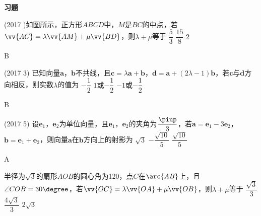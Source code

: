 \begin{exercise}{\textbf{习题}}
  \item%
    (2017 )如图所示，正方形$ABCD$中，$M$是$BC$的中点，若$\vv{AC}=\lambda\vv{AM}+\mu\vv{BD}$，则$\lambda+\mu$等于\xz
     {$\dfrac{5}3$}
     {$\dfrac{15}8$}
     {$2$}
    \begin{center}
    \end{center}
    \begin{answer}
      B
    \end{answer}
  \item%
    (2017  3)
    已知向量$\bm a$，$\bm b$不共线，且$\bm c=\lambda\bm a+\bm b$，$\bm d=\bm a+(2\lambda-1)\bm b$，若$\bm c$与$\bm d$方向相反，则实数$\lambda$的值为\xz
     {$-\dfrac12$}
     {$1$或$-\dfrac12$}
     {$-1$或$-\dfrac12$}
    \begin{answer}
      B
    \end{answer}
  \item%
    (2017  5)
    设$\bm e_1$，$\bm e_2$为单位向量，且$\bm e_1$，$\bm e_2$的夹角为$\dfrac{\piup}3$，若$\bm a=\bm e_1-3\bm e_2$，$\bm b=\bm e_1+\bm e_2$，则向量$\bm a$在$\bm b$方向上的射影为\xz
     {$\sqrt3$}
     {$-\dfrac{\sqrt{10}}5$}
     {$\dfrac{\sqrt{10}}5$}
    \begin{answer}
      A
    \end{answer}
  \item%
    半径为$\sqrt{3}$的扇形$AOB$的圆心角为120\degree，点$C$在$\arc{AB}$上，且$\angle{COB}=30\degree$，若$\vv{OC}=\lambda\vv{OA}+\mu\vv{OB}$，则$\lambda+\mu$等于\xz
     {$\dfrac{\sqrt{3}}3$}
     {$\dfrac{4\sqrt{3}}3$}
     {$2\sqrt{3}$}
    \begin{answer}

\end{answer}
\end{exercise}
